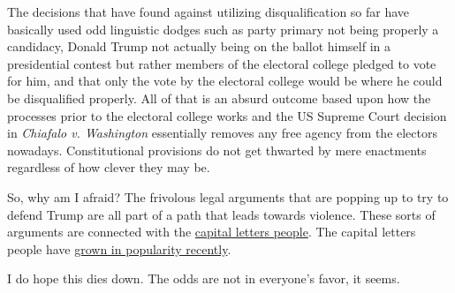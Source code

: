 The decisions that have found against utilizing disqualification so far
have basically used odd linguistic dodges such as party primary not
being properly a candidacy, Donald Trump not actually being on the
ballot himself in a presidential contest but rather members of the
electoral college pledged to vote for him, and that only the vote by the
electoral college would be where he could be disqualified properly. All
of that is an absurd outcome based upon how the processes prior to the
electoral college works and the US Supreme Court decision in
\emph{Chiafalo v. Washington} essentially removes any free agency from
the electors nowadays. Constitutional provisions do not get thwarted by
mere enactments regardless of how clever they may be.

So, why am I afraid? The frivolous legal arguments that are popping up
to try to defend Trump are all part of a path that leads towards
violence. These sorts of arguments are connected with the
\href{https://web.archive.org/web/20231127075115/https://www.splcenter.org/fighting-hate/extremist-files/ideology/sovereign-citizens-movement}{capital
letters people}. The capital letters people have
\href{https://www.ncbi.nlm.nih.gov/pmc/articles/PMC7513757/}{grown in
popularity recently}.

I do hope this dies down. The odds are not in everyone's favor, it
seems.
